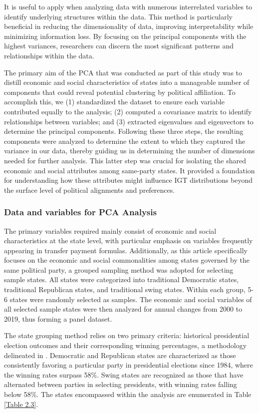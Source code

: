 It is useful to apply when analyzing data with numerous interrelated variables to identify underlying structures within the data. This method is particularly beneficial in reducing the dimensionality of data, improving interpretability while minimizing information loss. By focusing on the principal components with the highest variances, researchers can discern the most significant patterns and relationships within the data.

The primary aim of the PCA that was conducted as part of this study was to distill economic and social characteristics of states into a manageable number of components that could reveal potential clustering by political affiliation. To accomplish this, we (1) standardized the dataset to ensure each
variable contributed equally to the analysis; (2) computed a covariance matrix to identify relationships between variables; and (3) extracted eigenvalues and eigenvectors to determine the principal components. Following these three steps, the resulting components were analyzed to determine the extent to which they captured the variance in our data, thereby guiding us in determining the number of dimensions needed for further analysis. This latter step was crucial for isolating the shared economic and social attributes among same-party states. It provided a foundation for understanding how these attributes might influence IGT distributions beyond the surface level of political alignments and preferences.


\subsubsection{Data and variables for PCA Analysis}
The primary variables required mainly consist of economic and social characteristics at the state level, with particular emphasis on variables frequently appearing in transfer payment formulas. Additionally, as this article specifically focuses on the economic and social commonalities among states governed by the same political party, a grouped sampling method was adopted for selecting sample states. All states were categorized into traditional Democratic states, traditional Republican states, and traditional swing states. Within each group, 5-6 states were randomly selected as samples. The economic and social variables of all selected sample states were then analyzed for annual changes from 2000 to 2019, thus forming a panel dataset.

The state grouping method relies on two primary criteria: historical presidential election outcomes and their corresponding winning percentages, a methodology delineated in \textcite{beachler2015presidential}. Democratic and Republican states are characterized as those consistently favoring a particular party in presidential elections since 1984, where the winning rates surpass 58\%. Swing states are recognized as those that have alternated between parties in selecting presidents, with winning rates falling below 58\%. The states encompassed within the analysis are enumerated in Table \ref{Table 2.3}.



